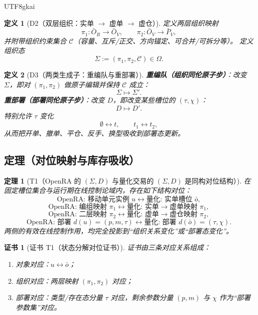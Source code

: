 \documentclass[12pt]{article}
\newtheorem{definition}{定义}[section]
\newtheorem{theorem}{定理}[section]
\newtheorem{Certificate}{证书}[section]
\begin{document}
\begin{CJK*}{UTF8}{gkai}
\begin{definition}[D2（双层组织：实单 $\to$ 虚单 $\to$ 虚仓）]
\label{def:tex28-ch18-d2}
定义两层组织映射
\[
  \pi_1:\bar O_R\to\bar O_V,\qquad
  \pi_2:\bar O_V\to\bar P_V,
\]
并附带组织约束集合 $\mathcal C$（容量、互斥/正交、方向锚定、可合并/可拆分等）。
定义组织态
\[
  \Sigma:=(\pi_1,\pi_2,\mathcal C)\in\Omega.
\]
\end{definition}

\begin{definition}[D3（两类生成子：重编队与重部署）]
\label{def:tex28-ch18-d3}
\textbf{重编队（组织同伦原子步）}：改变 $\Sigma$，即对 $(\pi_1,\pi_2)$ 做原子编辑并保持 $\mathcal C$ 成立：
\[
  \Sigma\mapsto\Sigma'.
\]
\textbf{重部署（部署同伦原子步）}：改变 $D$，即改变某些槽位的 $(\tau,\chi)$：
\[
  D\mapsto D'.
\]
特别允许 $\tau$ 变化
\[
  \emptyset\leftrightarrow t,\qquad t_1\leftrightarrow t_2,
\]
从而把开单、撤单、平仓、反手、换型吸收到部署态更新。
\end{definition}

\subsection{定理（对位映射与库存吸收）}
\label{subsec:tex28-ch18-thms}

\begin{theorem}[T1（OpenRA 的 $(\Sigma,D)$ 与量化交易的 $(\Sigma,D)$ 是同构对位结构）]
\label{thm:tex28-ch18-t1}
在固定槽位集合与运行期在线控制论域内，存在如下结构对位：
\[
  \text{OpenRA: 移动单元实例 }u
  \leftrightarrow
  \text{量化: 实单槽位 }\bar o,
\]
\[
  \text{OpenRA: 编组映射 }\pi_1
  \leftrightarrow
  \text{量化: 实单}\to\text{虚单映射 }\pi_1,
\]
\[
  \text{OpenRA: 二层映射 }\pi_2
  \leftrightarrow
  \text{量化: 虚单}\to\text{虚仓映射 }\pi_2,
\]
\[
  \text{OpenRA: 部署 }d(u)=(p,m,\tau)
  \leftrightarrow
  \text{量化: 部署 }d(\bar o)=(\tau,\chi).
\]
两侧的有效在线控制作用，均完全投影到“组织关系变化”或“部署态变化”。
\end{theorem}

\begin{Certificate}[证书 T1（状态分解对位证书）]
\label{cert:tex28-ch18-t1}
证书由三条对应关系组成：
\begin{enumerate}
  \item 对象对应：$u\leftrightarrow\bar o$；
  \item 组织对应：两层映射 $(\pi_1,\pi_2)$ 对应；
  \item 部署对应：类型/存在态分量 $\tau$ 对应，剩余参数分量 $(p,m)$ 与 $\chi$ 作为“部署参数集”对应。
\end{enumerate}
\end{Certificate}


\end{CJK*}
\end{document}
